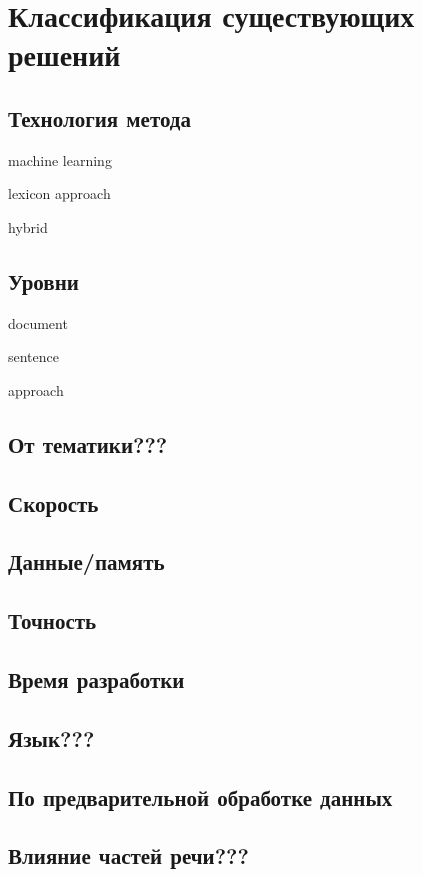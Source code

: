 \chapter{Классификация существующих решений}

\section{Технология метода}
machine learning

lexicon approach

hybrid

\section{Уровни}

document

sentence

approach

\section{От тематики???}

\section{Скорость}

\section{Данные/память}

\section{Точность}

\section{Время разработки}

\section{Язык???}

\section{По предварительной обработке данных}

\section{Влияние частей речи???}
